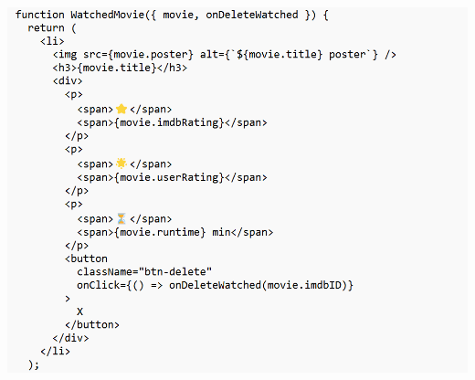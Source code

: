 \begin{enumerate}
\includegraphics[height=20cm,width=16cm]{project/images/APP.png}\\
\end{enumerate}

